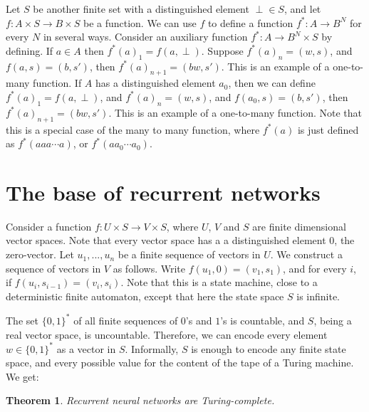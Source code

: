 \documentclass[10pt]{amsart}
\newtheorem{theorem}{Theorem}[section]
\theoremstyle{definition}
\begin{document}
Let $S$ be another finite set with a distinguished element $\perp\in S$, and let $f:A\times S\to B\times S$ be a function. We can use $f$ to define a function $f^*:A\to B^N$ for every $N$ in several ways. Consider an auxiliary function $f^*:A\to B^N\times S$ by defining. If $a\in A$ then $f^*(a)_1=f(a, \perp)$. Suppose $f^*(a)_n=(w, s)$, and  $f(a, s) = (b, s')$, then $f^*(a)_{n+1}=(bw, s')$.  This is an example of a one-to-many function. If $A$ has a distinguished element $a_0$, then we can define $f^*(a)_1=f(a, \perp)$, and $f^*(a)_n=(w, s)$, and  $f(a_0, s) = (b, s')$, then $f^*(a)_{n+1}=(bw, s')$.  This is an example of a one-to-many function.  Note that this is a special case of the many to many function, where $f^*(a)$ is just defined as $f^*(aaa\cdots a)$, or $f^*(aa_0\cdots a_0)$.


%
%




\section{The base of recurrent networks}

Consider a function $f:U\times S\to V\times S$, where $U$, $V$ and $S$ are finite dimensional vector spaces.
Note that every vector space has a a distinguished element $0$, the zero-vector.  Let $u_1,...,u_n$ be a finite
sequence of vectors in $U$.  We construct a sequence of vectors in $V$ as follows. Write $f(u_1, 0)=(v_1, s_1)$,
and for every $i$, if $f(u_{i}, s_{i-1})=(v_i, s_i)$. Note that this is a state machine, close to a
deterministic finite automaton, except that here the state space $S$ is infinite.

The set $\{0,1\}^*$ of all finite sequences of $0$'s and $1$'s is countable, and $S$, being a real vector space,
is uncountable.  Therefore, we can encode every element $w\in\{0,1\}^*$ as a vector in $S$.  Informally,
$S$ is enough to encode any finite state space, and every possible value for the content of the tape of a
Turing machine. We get:

\begin{theorem}
Recurrent neural networks are Turing-complete.
\end{theorem}
\end{document}
